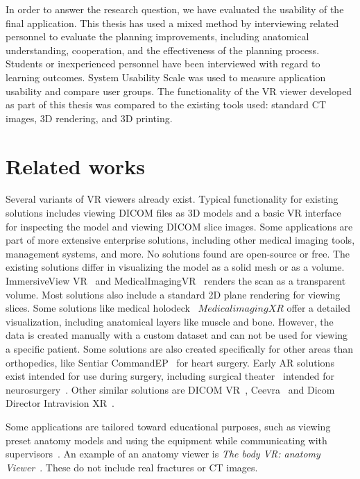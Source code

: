 \documentclass[a4paper]{report}
\begin{document}
In order to answer the research question, we have evaluated the usability of the final application.
This thesis has used a mixed method by interviewing related personnel to evaluate the planning improvements, including anatomical understanding, cooperation, and the effectiveness of the planning process. Students or inexperienced personnel have been interviewed with regard to learning outcomes. System Usability Scale was used to measure application usability and compare user groups.
The functionality of the VR viewer developed as part of this thesis was compared to the existing tools used: standard CT images, 3D rendering, and 3D printing.


\section{Related works}

Several variants of VR viewers already exist. Typical functionality for existing solutions includes viewing DICOM files as 3D models and a basic VR interface for inspecting the model and viewing DICOM slice images. Some applications are part of more extensive enterprise solutions, including other medical imaging tools, management systems, and more. No solutions found are open-source or free.
The existing solutions differ in visualizing the model as a solid mesh or as a volume. ImmersiveView VR~\cite{noauthor_immersiveview_nodate} and MedicalImagingVR~\cite{noauthor_medicalimagingvr_nodate} renders the scan as a transparent volume. Most solutions also include a standard 2D plane rendering for viewing slices.
Some solutions like medical holodeck~\cite{medical_holodeck_medicalholodeck_nodate} $Medical imaging XR$ offer a detailed visualization, including anatomical layers like muscle and bone. However, the data is created manually with a custom dataset and can not be used for viewing a specific patient.
Some solutions are also created specifically for other areas than orthopedics, like Sentiar CommandEP~\cite{noauthor_commandep_nodate} for heart surgery.
Early AR solutions exist intended for use during surgery, including surgical theater~\cite{noauthor_virtual_nodate} intended for neurosurgery~\cite{anthony_patient-specific_2021}.
Other similar solutions are DICOM VR~\cite{noauthor_dicom_nodate-1}, Ceevra~\cite{ceevra_inc_using_2019} and Dicom Director Intravision XR~\cite{dicomdirectorcom_surgeons_nodate}.

Some applications are tailored toward educational purposes, such as viewing preset anatomy models and using the equipment while communicating with supervisors~\cite{uppot_implementing_2019}. An example of an anatomy viewer is \emph{The body VR: anatomy Viewer}~\cite{noauthor_body_nodate}. These do not include real fractures or CT images.
\end{document}
